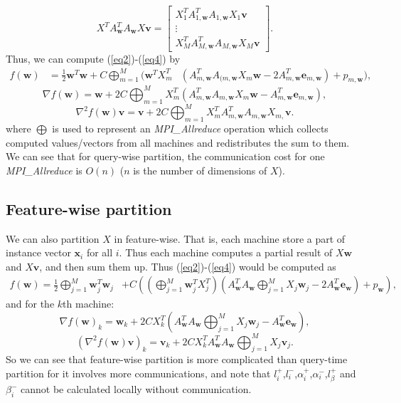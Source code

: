\documentclass[11pt, oneside]{article}   	%
\def\bx{{\boldsymbol x}}
\def\bv{{\boldsymbol v}}
\def\bw{{\boldsymbol w}}
\def\bv{{\boldsymbol v}}
\def\be{{\boldsymbol e}}
\begin{document}
\begin{equation*}
	X^TA_{\bw}^TA_{\bw} X\bv = 
	\left[\begin{array}{c}
	X_{1}^TA_{1,\bw}^TA_{1,\bw} X_1\bv  \\
	\vdots \\
	X_{M}^TA_{M,\bw}^TA_{M,\bw} X_M\bv 
	\end{array}\right].
\end{equation*}
Thus, we can compute (\ref{eq2})-(\ref{eq4}) by
\begin{equation}
\begin{aligned}
	f(\bw)
	&=\frac{1}{2}\bw^T\bw+C\bigoplus_{m=1}^{M}(\bw^TX_{m}^T
	&(A_{m,\bw}^TA_{(m,\bw}
	X_{m}\bw-2A_{m,\bw}^T\be_{m,\bw})
	+p_{m,\bw}),
\label{eq:fun_allred}
\end{aligned}
\end{equation}
\begin{equation}
	\nabla f(\bw)
	=\bw + 2C\bigoplus_{m=1}^{M}X_{m}^T(A_{m,\bw}^T
	A_{m,\bw}X_{m}\bw
	-A_{m,\bw}^T\be_{m,\bw}),
\label{eq:grad_allred}
\end{equation}
\begin{equation}
	\nabla^2 f(\bw)\bv
	=\bv + 2C\bigoplus_{m=1}^{M}X_{m}^TA_{m,\bw}^T
	A_{m,\bw}X_{m,}\bv.
\label{eq:Hv_allred}
\end{equation}
where $\bigoplus$ is used to represent an {\emph{MPI\_Allreduce}} operation which collects computed values/vectors from all machines and redistributes the sum to them. We can see that for query-wise partition, the communication cost for one {\emph{MPI\_Allreduce}} is $O(n)$ ($n$ is the number of dimensions of $X$). 
\subsection{Feature-wise partition}
We can also partition $X$ in feature-wise. That is, each machine store a part of instance vector $\bx_i$ for all $i$.
Thus each machine computes a partial result of $X\bw$ and $X\bv$, and then sum them up. Thus  (\ref{eq2})-(\ref{eq4}) would be computed as
\begin{equation}
\begin{aligned}
	f(\bw)=\frac{1}{2}\bigoplus_{j=1}^{M}\bw_{j}^T\bw_{j} 
	&+C((\bigoplus_{j=1}^{M}\bw_{j}^TX_{j}^T)
	(A_\bw^TA_\bw\bigoplus_{j=1}^{M}X_{j}
	\bw_{j}-2A_\bw^T\be_\bw)+p_\bw),
\label{eq:fun_allred_fw}
\end{aligned}
\end{equation}
and for the $k$th machine:
\begin{equation}
	\nabla f(\bw)_{k}
	=\bw_{k} + 2CX_{k}^T(A_\bw^TA_\bw\bigoplus_{j=1}^{M}
	X_{j}\bw_{j}-A_\bw^T\be_\bw),
\label{eq:grad_allred_fw}
\end{equation}
\begin{equation}
	(\nabla^2 f(\bw)\bv)_{k}
	=\bv_k + 2CX_{k}^TA_\bw^TA_\bw\bigoplus_{j=1}^{M}
	X_{j}\bv_{j}. 
\label{eq:Hv_allred_fw}
\end{equation}
So we can see that feature-wise partition is more complicated than query-time partition for it involves more communications, and note that $l_i^+$,$l_i^-$,$\alpha_i^+$,$\alpha_i^-$,$l_\beta^+$ and $\beta_i^-$ cannot be calculated locally without communication.
\end{document}
